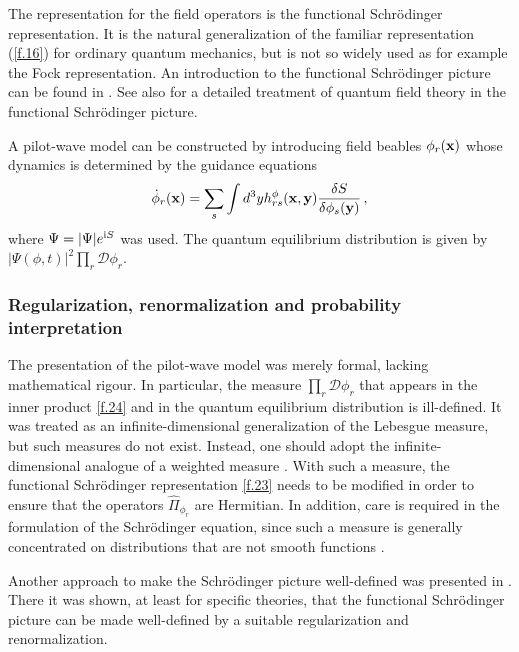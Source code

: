 \documentclass[12pt]{article}
\def\ii{\textrm i}
\begin{document}
The representation for the field operators is the functional Schr{\"o}\-ding\-er representation. It is the natural generalization of the familiar representation (\ref{f.16}) for ordinary quantum mechanics, but is not so widely used as for example the Fock representation. An introduction to the functional Schr{\"o}\-ding\-er picture can be found in \cite{jackiw95}. See also \cite{hatfield91} for a detailed treatment of quantum field theory in the functional Schr{\"o}\-ding\-er picture. 

A pilot-wave model can be constructed by introducing field beables $\phi_r({\bf x})$ whose dynamics is determined by the guidance equations
\begin{equation}
{\dot \phi}_r({\bf x}) = \sum_s \int d^3 y h^\phi_{rs}({\bf x},{\bf y})\frac{\delta S}{\delta \phi_s({\bf y})} \,,
\label{f.26}
\end{equation}
where $\Psi = |\Psi|e^{\ii S}$ was used. The quantum equilibrium distribution is given by $|\Psi(\phi,t)|^2 \prod_r {\mathcal D} \phi_r$. 


\subsubsection{Regularization, renormalization and probability interpretation}\label{regularizationandrenormalization}
The presentation of the pilot-wave model was merely formal, lacking mathematical rigour. In particular, the measure $\prod_r {\mathcal D} \phi_r$ that appears in the inner product \eqref{f.24} and in the quantum equilibrium distribution is ill-defined. It was treated as an infinite-dimensional generalization of the Lebesgue measure, but such measures do not exist. Instead, one should adopt the infinite-dimensional analogue of a weighted measure \cite{glimm87,isham91,isham92}. With such a measure, the functional Schr\"odinger representation \eqref{f.23} needs to be modified in order to ensure that the operators ${\widehat \Pi}_{\phi_r}$ are Hermitian. In addition, care is required in the formulation of the Schr\"odinger equation, since such a measure is generally concentrated on distributions that are not smooth functions \cite{colella73}. 

Another approach to make the Schr\"odinger picture well-defined was presented in \cite{symanzik81,luscher85,cooper87,pi87,luscher92}. There it was shown, at least for specific theories, that the functional Schr{\"o}\-ding\-er picture can be made well-defined by a suitable regularization and renormalization. 
\end{document}
